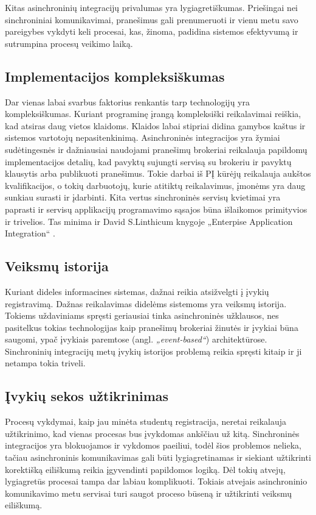 Kitas asinchroninių integracijų privalumas yra lygiagretiškumas. Priešingai nei sinchroniniai komunikavimai,
pranešimus gali prenumeruoti ir vienu metu savo pareigybes vykdyti keli procesai, kas, žinoma, padidina sistemos
efektyvumą ir sutrumpina procesų veikimo laiką.

\subsection{Implementacijos kompleksiškumas}

Dar vienas labai svarbus faktorius renkantis tarp technologijų yra kompleksiškumas. Kuriant programinę įrangą kompleksiški reikalavimai
reiškia, kad atsiras daug vietos klaidoms. Klaidos labai stipriai didina gamybos kaštus ir sistemos vartotojų nepasitenkinimą.
Asinchroninės integracijos yra žymiai sudėtingesnės ir dažniausiai naudojami pranešimų brokeriai reikalauja papildomų 
implementacijos detalių, kad pavyktų sujungti servisą su brokeriu ir pavyktų klausytis arba publikuoti pranešimus.
Tokie darbai iš PĮ kūrėjų reikalauja aukštos kvalifikacijos, o tokių darbuotojų, kurie atitiktų reikalavimus,  įmonėms yra daug sunkiau surasti ir įdarbinti.
Kita vertus sinchroninės servisų kvietimai yra paprasti ir servisų applikacijų programavimo sąsajos būna išlaikomos primityvios ir trivelios.
Tas minima ir David S.Linthicum knygoje „Enterpise Application Integration“ \cite{Bk3}.

\subsection{Veiksmų istorija}

Kuriant dideles informacines sistemas, dažnai reikia atsižvelgti į įvykių registravimą. Dažnas reikalavimas didelėms sistemoms yra veiksmų istorija.
Tokiems uždaviniams spręsti geriausiai tinka asinchroninės užklausos, nes pasitelkus tokias technologijas kaip pranešimų brokeriai
žinutės ir įvykiai būna saugomi, ypač įvykiais paremtose (angl. \textit{„event-based“}) architektūrose.
Sinchroninių integracijų metų įvykių istorijos problemą reikia spręsti kitaip ir ji netampa tokia triveli.

\subsection{Įvykių sekos užtikrinimas}

Procesų vykdymai, kaip jau minėta studentų registracija, neretai reikalauja užtikrinimo, kad vienas procesas bus įvykdomas ankščiau už kitą.
Sinchroninės integracijos yra blokuojamos ir vykdomos paeiliui, todėl šios problemos nelieka, tačiau asinchroninis komunikavimas gali būti 
lygiagretinamas ir siekiant užtikrinti korektišką eiliškumą reikia įgyvendinti papildomos logiką. Dėl tokių atvejų, lygiagretūs procesai
tampa dar labiau komplikuoti. Tokiais atvejais asinchroninio komunikavimo metu servisai turi saugot proceso būseną ir užtikrinti veiksmų eiliškumą.

